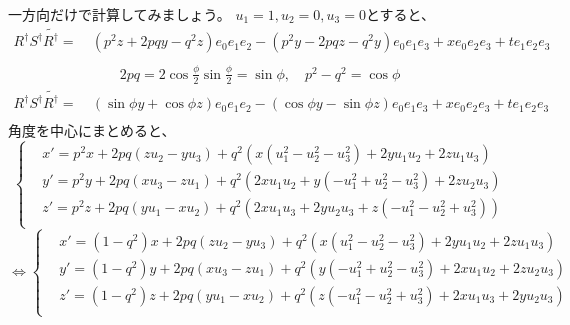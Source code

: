 \documentclass[a4paper,12pt,notitlepage]{jsreport}
\begin{document}
一方向だけで計算してみましょう。
$ u_1 = 1 , u_2 = 0 , u_3 = 0$とすると、
\begin{equation}
  \begin{split}
    R^\dag S^\dag \widetilde{R^\dag} 
    = ~ & (p^2 z + 2 p q y - q^2 z) e_0e_1e_2 - (p^2 y - 2 p q z - q^2 y) e_0e_1e_3
    + x e_0e_2e_3 + t e_1e_2e_3 \\
  \end{split}
\end{equation}
\begin{equation}
  \begin{split}
    2 p q = 2 \cos \frac{\phi}{2} \sin \frac{\phi}{2} = \sin \phi , \quad
    p^2 - q^2 = \cos \phi
  \end{split}
\end{equation}
\begin{equation}
  \begin{split}
    R^\dag S^\dag \widetilde{R^\dag} 
    = ~ & (\sin \phi y + \cos \phi z) e_0e_1e_2 - (\cos \phi y - \sin \phi z) e_0e_1e_3
    + x e_0e_2e_3 + t e_1e_2e_3 \\
  \end{split}
\end{equation}
角度を中心にまとめると、
\begin{equation}
  \left\{
    \begin{aligned}
      &x' = p^2 x + 2 p q (z u_2 - y u_3) + q^2 (x (u_1^2 - u_2^2 - u_3^2) + 2 y u_1 u_2 + 2 z u_1 u_3) \\
      &y' = p^2 y + 2 p q (x u_3 - z u_1) + q^2 (2 x u_1 u_2 + y ( - u_1^2 + u_2^2 - u_3^2) + 2 z u_2 u_3) \\
      &z' = p^2 z + 2 p q (y u_1 - x u_2) + q^2 (2 x u_1 u_3 + 2 y u_2 u_3 + z ( - u_1^2 - u_2^2 + u_3^2)) \\
    \end{aligned}
  \right.
\end{equation}
\begin{equation}
  \Longleftrightarrow
  \left\{
    \begin{aligned}
      &x' = (1 - q^2) x + 2 p q (z u_2 - y u_3) + q^2 (x (u_1^2 - u_2^2 - u_3^2) + 2 y u_1 u_2 + 2 z u_1 u_3) \\
      &y' = (1 - q^2) y + 2 p q (x u_3 - z u_1) + q^2 (y ( - u_1^2 + u_2^2 - u_3^2) + 2 x u_1 u_2 + 2 z u_2 u_3) \\
      &z' = (1 - q^2) z + 2 p q (y u_1 - x u_2) + q^2 (z ( - u_1^2 - u_2^2 + u_3^2) + 2 x u_1 u_3 + 2 y u_2 u_3) \\
    \end{aligned}
  \right.
\end{equation}
\end{document}
